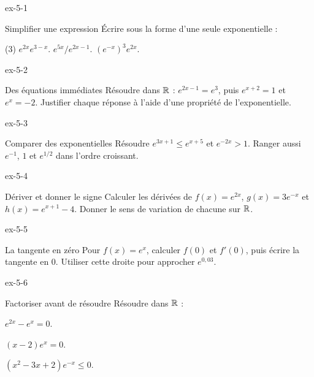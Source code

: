 \begin{blocLivre}{ex-5-1}
\begin{exercice}[1]{Simplifier une expression}
Écrire sous la forme d'une seule exponentielle :
\begin{tasks}(3)
\task $e^{2x}e^{3-x}$.
\task $e^{5x}/e^{2x-1}$.
\task $(e^{-x})^3e^{2x}$.
\end{tasks}
\end{exercice}
\end{blocLivre}
\begin{blocLivre}{ex-5-2}
\begin{exercice}[1]{Des équations immédiates}
Résoudre dans $\mathbb{R}$ : $e^{2x-1}=e^3$, puis $e^{x+2}=1$ et $e^x=-2$.
Justifier chaque réponse à l'aide d'une propriété de l'exponentielle.
\end{exercice}
\end{blocLivre}
\begin{blocLivre}{ex-5-3}
\begin{exercice}[1]{Comparer des exponentielles}
Résoudre $e^{3x+1}\leq e^{x+5}$ et $e^{-2x}>1$.
Ranger aussi $e^{-1}$, $1$ et $e^{1/2}$ dans l'ordre croissant.
\end{exercice}
\end{blocLivre}
\begin{blocLivre}{ex-5-4}
\begin{exercice}[1]{Dériver et donner le signe}
Calculer les dérivées de $f(x)=e^{2x}$, $g(x)=3e^{-x}$ et $h(x)=e^{x+1}-4$.
Donner le sens de variation de chacune sur $\mathbb{R}$.
\end{exercice}
\end{blocLivre}
\begin{blocLivre}{ex-5-5}
\begin{exercice}[1]{La tangente en zéro}
Pour $f(x)=e^x$, calculer $f(0)$ et $f'(0)$, puis écrire la tangente en 0.
Utiliser cette droite pour approcher $e^{0{,}03}$.
\end{exercice}
\end{blocLivre}
\clearpage
{}
\begin{blocLivre}{ex-5-6}
\begin{exercice}[2]{Factoriser avant de résoudre}
Résoudre dans $\mathbb{R}$ :
\begin{questions}\item $e^{2x}-e^x=0$.
\item $(x-2)e^x=0$.
\item $(x^2-3x+2)e^{-x}\leq0$.
\end{questions}
\end{exercice}
\end{blocLivre}
